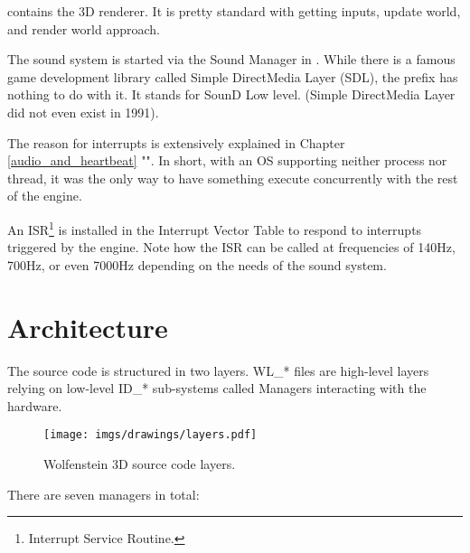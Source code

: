 \documentclass[book.tex]{subfiles}
\begin{document}
\par
\begin{minipage}{\textwidth}

\end{minipage}
\par
{} contains the 3D renderer. It is pretty standard with getting inputs, update world, and render world approach.\\
\par
\begin{minipage}{\textwidth}

\end{minipage}
\par
The sound system is started via the Sound Manager in . While there is a famous game development library called Simple DirectMedia Layer (SDL), the prefix  has nothing to do with it. It stands for SounD Low level. (Simple DirectMedia Layer did not even exist in 1991).\\
\par
The reason for interrupts is extensively explained in Chapter \ref{audio_and_heartbeat} "". In short, with an OS supporting neither process nor thread, it was the only way to have something execute concurrently with the rest of the engine.\\
\par
An ISR\footnote{Interrupt Service Routine.} is installed in the Interrupt Vector Table to respond to interrupts triggered by the engine. Note how the ISR can be called at frequencies of 140Hz, 700Hz, or even 7000Hz depending on the needs of the sound system.\\
\par
\begin{minipage}{\textwidth}

\end{minipage}
\par
















\section{Architecture}

The source code is structured in two layers. WL\_* files are high-level layers relying on low-level ID\_* sub-systems called Managers interacting with the hardware.\\
\par
\begin{figure}[H]
\centering
\texttt{[image: imgs/drawings/layers.pdf]} 
\caption{Wolfenstein 3D source code layers.}
 \end{figure}
 \par
There are seven managers in total:\\
\end{document}
